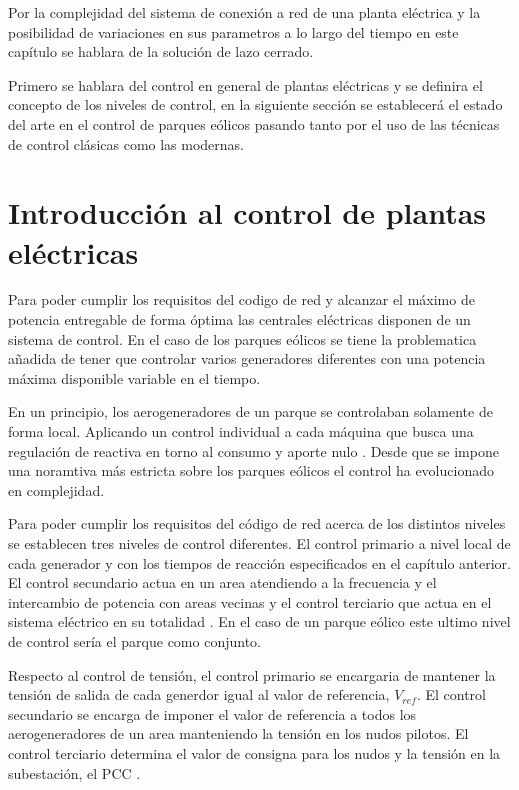 \documentclass{book}
\begin{document}
Por la complejidad del sistema de conexi\'on a red de una planta el\'ectrica y la posibilidad de variaciones en sus parametros a lo largo del tiempo en este cap\'itulo se hablara de la soluci\'on de lazo cerrado. \par

 Primero se hablara del control en general de plantas el\'ectricas y se definira el concepto de los niveles de control, en la siguiente secci\'on se establecer\'a el estado del arte en el control de parques e\'olicos pasando tanto por el uso de las t\'ecnicas de control cl\'asicas como las modernas. \par 

	\section{Introducci\'on al control de plantas el\'ectricas}

Para poder cumplir los requisitos del codigo de red y alcanzar el m\'aximo de potencia entregable de forma \'optima las centrales el\'ectricas disponen de un sistema de control. En el caso de los parques e\'olicos se tiene la problematica añadida de tener que controlar varios generadores diferentes con una potencia m\'axima disponible variable en el tiempo. \par

En un principio, los aerogeneradores de un parque se controlaban solamente de forma local. Aplicando un control individual a cada m\'aquina que busca una regulaci\'on de reactiva en torno al consumo y aporte nulo \cite{PI_QV}. Desde que se impone una noramtiva m\'as estricta sobre los parques e\'olicos el control ha evolucionado en complejidad. \par

Para poder cumplir los requisitos del c\'odigo de red acerca de los distintos niveles se establecen tres niveles de control diferentes. El control primario a nivel local de cada generador y con los tiempos de reacci\'on especificados en el cap\'itulo anterior. El control secundario actua en un area atendiendo a la frecuencia y el intercambio de potencia con areas vecinas y el control terciario que actua en el sistema el\'ectrico en su totalidad \cite{NivelesDeControl}. En el caso de un parque e\'olico este ultimo nivel de control ser\'ia el parque como conjunto. \par

Respecto al control de tensi\'on, el control primario se encargaria de mantener la tensi\'on de salida de cada generdor igual al valor de referencia, $V_{ref}$. El control secundario se encarga de imponer el valor de referencia a todos los aerogeneradores de un area manteniendo la tensi\'on en los nudos pilotos. El control terciario determina el valor de consigna para los nudos y la tensi\'on en la subestaci\'on, el PCC \cite{ControlCentrales}. \par
\end{document}
